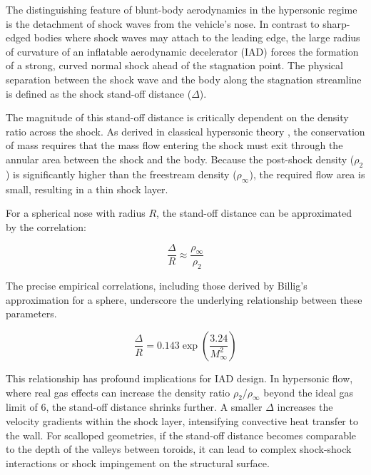 \par
The distinguishing feature of blunt-body aerodynamics in the hypersonic regime is the detachment of shock waves from the vehicle's nose. In contrast to sharp-edged bodies where shock waves may attach to the leading edge, the large radius of curvature of an inflatable aerodynamic decelerator (IAD) forces the formation of a strong, curved normal shock ahead of the stagnation point. The physical separation between the shock wave and the body along the stagnation streamline is defined as the shock stand-off distance ($\Delta$).
\par
The magnitude of this stand-off distance is critically dependent on the density ratio across the shock. As derived in classical hypersonic theory \cite{AndersonHypersonic}, the conservation of mass requires that the mass flow entering the shock must exit through the annular area between the shock and the body. Because the post-shock density ($\rho_2$) is significantly higher than the freestream density ($\rho_{\infty}$), the required flow area is small, resulting in a thin shock layer.

For a spherical nose with radius $R$, the stand-off distance can be approximated by the correlation:

\begin{equation}
    \frac{\Delta}{R} \approx \frac{\rho_{\infty}}{\rho_2}
\end{equation}

The precise empirical correlations, including those derived by Billig's approximation for a sphere, underscore the underlying relationship between these parameters.

\begin{equation}
    \frac{\Delta}{R} = 0.143 \exp\left(\frac{3.24}{M_{\infty}^2}\right)
\end{equation}

This relationship has profound implications for IAD design. In hypersonic flow, where real gas effects can increase the density ratio $\rho_2/\rho_{\infty}$ beyond the ideal gas limit of 6, the stand-off distance shrinks further. A smaller $\Delta$ increases the velocity gradients within the shock layer, intensifying convective heat transfer to the wall. For scalloped geometries, if the stand-off distance becomes comparable to the depth of the valleys between toroids, it can lead to complex shock-shock interactions or shock impingement on the structural surface.

